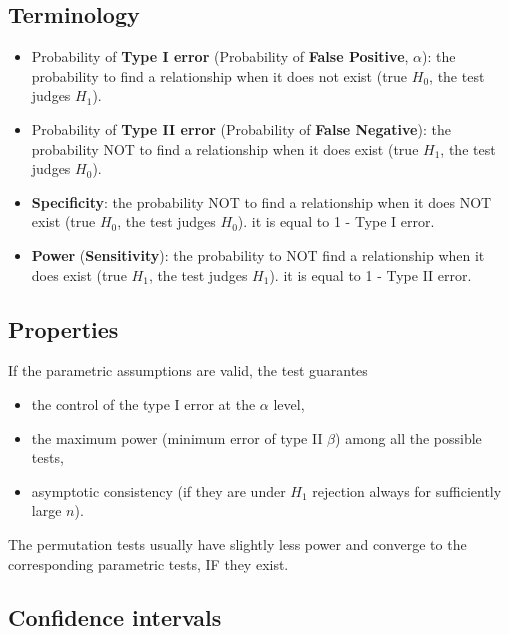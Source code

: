 \documentclass[]{article}
\providecommand{\tightlist}{%
  \setlength{\itemsep}{0pt}\setlength{\parskip}{0pt}}
\begin{document}
\subsection{Terminology}\label{terminology}

\begin{itemize}
\item
  Probability of \textbf{Type I error} (Probability of \textbf{False
  Positive}, \(\alpha\)): the probability to find a relationship when it
  does not exist (true \(H_0\), the test judges \(H_1\)).
\item
  Probability of \textbf{Type II error} (Probability of \textbf{False
  Negative}): the probability NOT to find a relationship when it does
  exist (true \(H_1\), the test judges \(H_0\)).
\item
  \textbf{Specificity}: the probability NOT to find a relationship when
  it does NOT exist (true \(H_0\), the test judges \(H_0\)). it is equal
  to 1 - Type I error.
\item
  \textbf{Power} (\textbf{Sensitivity}): the probability to NOT find a
  relationship when it does exist (true \(H_1\), the test judges
  \(H_1\)). it is equal to 1 - Type II error.
\end{itemize}

\subsection{Properties}\label{properties}

If the parametric assumptions are valid, the test guarantes

\begin{itemize}
\tightlist
\item
  the control of the type I error at the \(\alpha\) level,\\
\item
  the maximum power (minimum error of type II \(\beta\)) among all the
  possible tests,\\
\item
  asymptotic consistency (if they are under \(H_1\) rejection always for
  sufficiently large \(n\)).
\end{itemize}

The permutation tests usually have slightly less power and converge to
the corresponding parametric tests, IF they exist.

\subsection{Confidence intervals}\label{confidence-intervals}
\end{document}
